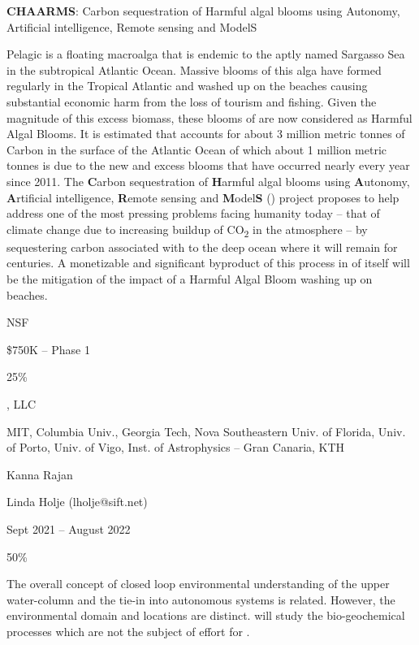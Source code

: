\begin{description}[noitemsep,topsep=0pt,parsep=0pt,partopsep=0pt]

\item [Title:] \textbf{CHAARMS}: Carbon sequestration of Harmful algal
  blooms using Autonomy, Artificial intelligence, Remote sensing and
  ModelS

\item [Summary:] Pelagic \sar is a floating macroalga that is endemic to
  the aptly named Sargasso Sea in the subtropical Atlantic Ocean.
  Massive blooms of this alga have formed regularly in the Tropical
  Atlantic and washed up on the beaches causing substantial economic
  harm from the loss of tourism and fishing. Given the magnitude of this
  excess
  biomass, these blooms of \sar are now considered as Harmful Algal
  Blooms. It is estimated that \sar accounts for about 3 million metric
  tonnes of Carbon in the surface of the Atlantic Ocean of which about 1
  million metric tonnes is due to the new and excess blooms that have
  occurred nearly every year since 2011. The \textbf{C}arbon
  sequestration of \textbf{H}armful algal blooms using
  \textbf{A}utonomy, \textbf{A}rtificial intelligence, \textbf{R}emote
  sensing and \textbf{M}odel\textbf{S} (\projce) project proposes to help
  address one of the most pressing problems facing humanity today --
  that of climate change due to increasing buildup of
  CO\textsubscript{2} in the atmosphere -- by sequestering carbon
  associated with \sar to the deep ocean where it will remain for
  centuries. A monetizable and significant byproduct of this process in
  of itself will be the mitigation of the impact of a Harmful Algal
  Bloom washing up on beaches.

\item [Source:] NSF
\item [Amount of Funding:] \$750K -- Phase 1
\item [\%-age of effort:] 25\%  
\item [Identity of prime Offeror:] \orge, LLC
\item [Subawardees:] MIT, Columbia Univ., Georgia Tech, Nova
  Southeastern Univ. of Florida, Univ. of Porto, Univ. of Vigo, Inst. of
  Astrophysics -- Gran Canaria, KTH
\item [Technical contact:] Kanna Rajan
\item [Administrative/business contact:] Linda Holje (lholje@sift.net)
\item [Period of performance:] Sept 2021 -- August 2022
\item [Proposed time on \proje:] 50\%
\item [Relationship of proposed project:] The overall concept of closed
  loop environmental understanding of the upper water-column and the
  tie-in into autonomous systems is related. However, the environmental
  domain and locations are distinct. \proj will study the
  bio-geochemical processes which are not the subject of effort for \projce.
  
\end{description}
